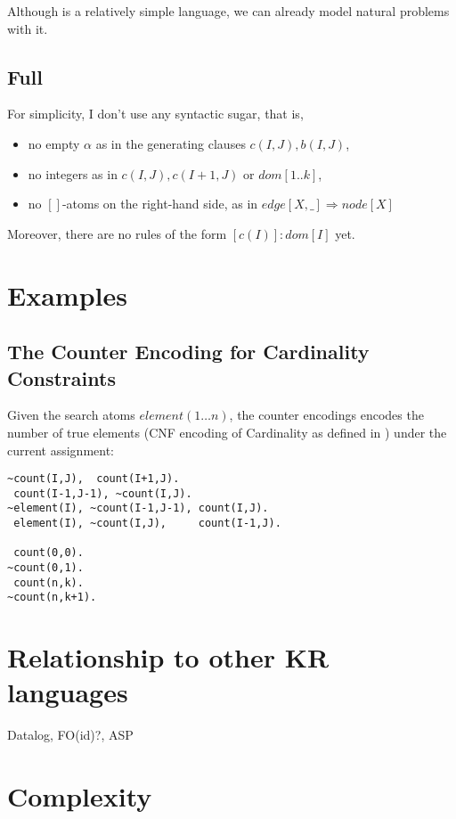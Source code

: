 \documentclass[conference]{IEEEtran}
\begin{document}
{\color{blue} Although \bcore is a relatively simple language, we can
already model natural problems with it. 

\begin{example}
  
\end{example}

}


\subsection{Full \bule}



{\color{red}For simplicity, I don't use any syntactic sugar, that is,
%
\begin{itemize}

  \item no empty $\alpha$ as in the generating clauses
    $c(I,J),b(I,J)$,

  \item no integers as in $c(I,J),c(I+1,J)$ or $dom[1..k]$,

  \item no $[]$-atoms on the right-hand side, as in $edge[X,\_ ]
    \Rightarrow node[X]$

\end{itemize}
Moreover, there are no rules of the form $[c(I)]:dom[I]$ yet. 
}

\section{Examples}

\subsection{The Counter Encoding for Cardinality Constraints}


Given the search atoms $element(1\ldots n)$, the counter encodings encodes the
number of true elements (CNF encoding of Cardinality as defined in \cite{Sinz05})
under the current assignment:

\begin{lstlisting}
~count(I,J),  count(I+1,J).
 count(I-1,J-1), ~count(I,J).
~element(I), ~count(I-1,J-1), count(I,J).
 element(I), ~count(I,J),     count(I-1,J).

 count(0,0).
~count(0,1).
 count(n,k).
~count(n,k+1).
\end{lstlisting}

\section{Relationship to other KR languages}

Datalog, FO(id)?, ASP

\section{Complexity}



\end{document}

